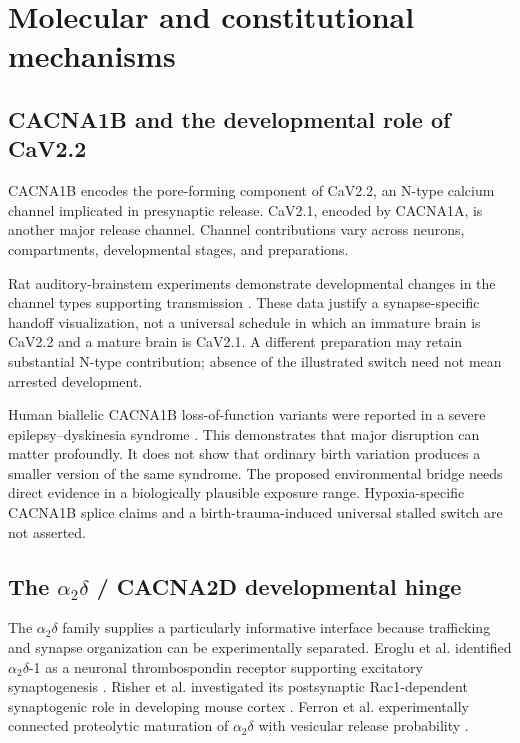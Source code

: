 \section{Molecular and constitutional mechanisms}

\subsection{CACNA1B and the developmental role of CaV2.2}

CACNA1B encodes the pore-forming component of CaV2.2, an N-type calcium channel implicated in presynaptic release. CaV2.1, encoded by CACNA1A, is another major release channel. Channel contributions vary across neurons, compartments, developmental stages, and preparations.

Rat auditory-brainstem experiments demonstrate developmental changes in the channel types supporting transmission \cite{ref8}. These data justify a synapse-specific handoff visualization, not a universal schedule in which an immature brain is CaV2.2 and a mature brain is CaV2.1. A different preparation may retain substantial N-type contribution; absence of the illustrated switch need not mean arrested development.

Human biallelic CACNA1B loss-of-function variants were reported in a severe epilepsy–dyskinesia syndrome \cite{ref9}. This demonstrates that major disruption can matter profoundly. It does not show that ordinary birth variation produces a smaller version of the same syndrome. The proposed environmental bridge needs direct evidence in a biologically plausible exposure range. Hypoxia-specific CACNA1B splice claims and a birth-trauma-induced universal stalled switch are not asserted.


\subsection{The \ensuremath{\alpha_2\delta} / CACNA2D developmental hinge}

The \ensuremath{\alpha_2\delta} family supplies a particularly informative interface because trafficking and synapse organization can be experimentally separated. Eroglu et al. identified \ensuremath{\alpha_2\delta}-1 as a neuronal thrombospondin receptor supporting excitatory synaptogenesis \cite{ref10}. Risher et al. investigated its postsynaptic Rac1-dependent synaptogenic role in developing mouse cortex \cite{ref11}. Ferron et al. experimentally connected proteolytic maturation of \ensuremath{\alpha_2\delta} with vesicular release probability \cite{ref12}.

